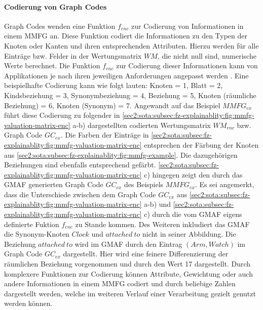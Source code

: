 \paragraph{Codierung von Graph Codes}
\label{sec2:sota:par:gc-encoding}
Graph Codes wenden eine Funktion $f_{enc}$ zur Codierung von Informationen in einem MMFG an.
Diese Funktion codiert die Informationen zu den Typen der Knoten oder Kanten und ihren entsprechenden Attributen.
Hierzu werden für alle Einträge bzw. Felder in der Wertungsmatrix $WM$, die nicht null sind, numerische Werte berechnet.
Die Funktion $f_{enc}$ zur Codierung dieser Informationen kann von Applikationen je nach ihren jeweiligen Anforderungen angepasst werden \cite{gc-2d-proj-mmfg}.
Eine beispielhafte Codierung kann wie folgt lauten: Knoten = 1, Blatt = 2, Kindsbeziehung = 3, Synonymbeziehung = 4, Beziehung = 5, Knoten (räumliche Beziehung) = 6, Knoten (Synonym) = 7.
Angewandt auf das Beispiel $MMFG_{ex}$ führt diese Codierung zu folgender in \cref{sec2:sota:subsec:fz-explainablity:fig:mmfg-valuation-matrix-enc} a-b) dargestellten codierten Wertungsmatrix $WM_{enc}$ bzw. Graph Code $GC_{ex}$.
Die Farben der Einträge in \cref{sec2:sota:subsec:fz-explainablity:fig:mmfg-valuation-matrix-enc} entsprechen der Färbung der Knoten aus \cref{sec2:sota:subsec:fz-explainablity:fig:mmfg-example}. 
Die dazugehörigen Beziehungen sind ebenfalls entsprechend gefärbt.
\cref{sec2:sota:subsec:fz-explainablity:fig:mmfg-valuation-matrix-enc} c) hingegen zeigt den durch das GMAF generierten Graph Code $GC_{ex}$ des Beispiels $MMFG_{ex}$.
Es sei angemerkt, dass die Unterschiede zwischen dem Graph Code $GC_{ex}$ aus \cref{sec2:sota:subsec:fz-explainablity:fig:mmfg-valuation-matrix-enc} a-b) und \cref{sec2:sota:subsec:fz-explainablity:fig:mmfg-valuation-matrix-enc} c) durch die vom GMAF eigens definierte Fuktion $f_{enc}$ zu Stande kommen.
Des Weiteren inkludiert das GMAF die Synonym-Knoten $Clock$ und $attached~to$ nicht in seiner Abbildung.
Die Beziehung $attached~to$ wird im GMAF durch den Eintrag $(Arm,Watch)$ im Graph Code $GC_{ex}$ dargestellt.
Hier wird eine feinere Differenzierung der räumlichen Beziehung vorgenommen und durch den Wert 17 dargestellt.
Durch komplexere Funktionen zur Codierung können Attribute, Gewichtung oder auch andere Informationen in einem MMFG codiert und durch beliebige Zahlen dargestellt werden, welche im weiteren Verlauf einer Verarbeitung gezielt genutzt werden können.

